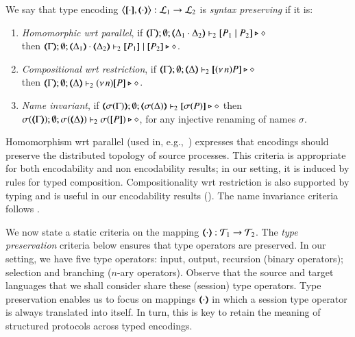 \begin{definition}%
	\label{def:sep}
	We say that 
	type encoding 
	$\enco{\map{\cdot}, \mapt{\cdot}}: \tyl{L}_1 \to \tyl{L}_2$ is \emph{syntax preserving}
	if it is:
	
	\begin{enumerate}[1.]
		\item	\emph{Homomorphic wrt parallel},   if 
		$\mapt{\Gamma}; \emptyset; \mapt{\Delta_1 \cat \Delta_2} \proves_2 \map{P_1 \Par P_2} \hastype \Proc$ \\
		then 
		$\mapt{\Gamma}; \emptyset; \mapt{\Delta_1} \cat \mapt{\Delta_2} \proves_2 \map{P_1} \Par \map{P_2} \hastype \Proc$.

		\item	\emph{Compositional wrt restriction},  if 
		$\mapt{\Gamma}; \emptyset; \mapt{\Delta} \proves_2 \map{\news{n}P} \hastype \Proc$ \\
		then 
		$\mapt{\Gamma}; \emptyset; \mapt{\Delta} \proves_2 \news{n}\map{P} \hastype \Proc$.
		
		\item \emph{Name invariant},   if
		$\mapt{\sigma(\Gamma)}; \emptyset; \mapt{\sigma(\Delta)} \proves_2 \map{\sigma(P)} \hastype \Proc$
		then \\
		$\sigma(\mapt{\Gamma}); \emptyset; \sigma(\mapt{\Delta}) \proves_2 \sigma(\map{P}) \hastype \Proc$, 
		for any injective renaming  of names $\sigma$.
	\end{enumerate}
\end{definition}

\smallskip 

\noi Homomorphism wrt parallel (used in, e.g.,~\cite{Palamidessi03,DBLP:conf/lics/PalamidessiSVV06})
expresses that encodings should preserve the distributed topology of source processes. This criteria 
 is appropriate for both encodability and non encodability results; in our setting, it is
induced by rules for typed composition.
Compositionality wrt restriction 
is also supported by typing and is 
useful in our encodability results ().
The name invariance criteria follows \cite{DBLP:journals/iandc/Gorla10,DBLP:conf/icalp/LanesePSS10}. 

We now state a static criteria on the mapping 
$(\!\!\langle\cdot\rangle\!\!): {\cal{T}}_1 \to {\cal{T}}_2$. %
The \emph{type preservation} criteria below ensures that type operators are preserved.
In our setting, 
we have five type operators: input, output, recursion (binary operators); selection and 
branching ($n$-ary operators). 
Observe that the source and target languages that we shall consider share these (session) type operators.
Type preservation enables us to focus on 
mappings $(\!\!\langle\cdot\rangle\!\!)$ in which a session type operator is always translated into itself. 
In turn, this is key to retain the meaning of structured protocols across typed encodings.

